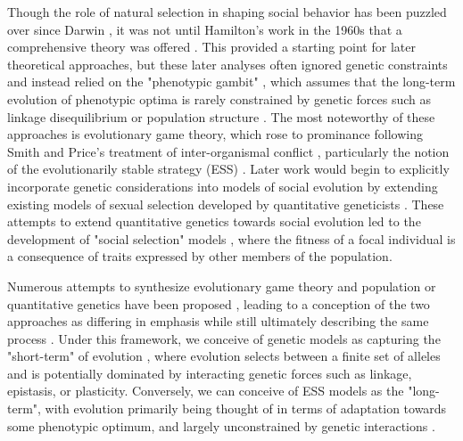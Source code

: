 \documentclass[11pt]{article}
\begin{document}


Though the role of natural selection in shaping social behavior has been puzzled over since Darwin \cite{darwin_origin_1882}, it was not until Hamilton's work in the 1960s that a comprehensive theory was offered \cite{hamilton_evolution_1963, hamilton_genetical_1964}. This provided a starting point for later theoretical approaches, but these later analyses often ignored genetic constraints and instead relied on the "phenotypic gambit" \cite{grafen_chapter_nodate}, which assumes that the long-term evolution of phenotypic optima is rarely constrained by genetic forces such as linkage disequilibrium or population structure \cite{eshel_changing_1996}.
The most noteworthy of these approaches is evolutionary game theory, which rose to prominance following Smith and Price's treatment of inter-organismal conflict \cite{smith_logic_1973}, particularly the notion of the evolutionarily stable strategy (ESS) \cite{smith_evolution_1982, dugatkin_game_1998}. Later work would begin to explicitly incorporate genetic considerations into models of social evolution by extending existing models of sexual selection developed by quantitative geneticists \cite{lande_sexual_1980, lande_models_1981, kirkpatrick_sexual_1982, wolf_interacting_1999}. These attempts to extend quantitative genetics towards social evolution led to the development of "social selection" models \cite{wolf_interacting_1999}, where the fitness of a focal individual is a consequence of traits expressed by other members of the population. \par
Numerous attempts to synthesize evolutionary game theory and population or quantitative genetics have been proposed \cite{eshel_changing_1996, hammerstein_darwinian_1996, weissing_genetic_1996, aoki_quantitative_1983, aoki_quantitative_1984, gomulkiewicz_game_2000, lion_theoretical_2018, taylor_selection_1996, queller_quantitative_1992, queller_expanded_2011}, leading to a conception of the two approaches as differing in emphasis while still ultimately describing the same process \cite{mcglothlin_synthesis_2022, van_cleve_social_2015-1}. Under this framework, we conceive of genetic models as capturing the "short-term" of evolution \cite{lande_sexual_1980, eshel_changing_1996, moore_interacting_1997}, where evolution selects between a finite set of alleles and is potentially dominated by interacting genetic forces such as linkage, epistasis, or plasticity. Conversely, we can conceive of ESS models as the "long-term", with evolution primarily being thought of in terms of adaptation towards some phenotypic optimum, and largely unconstrained by genetic interactions \cite{mcnamara_game_2020, smith_evolution_1982}.
\end{document}
